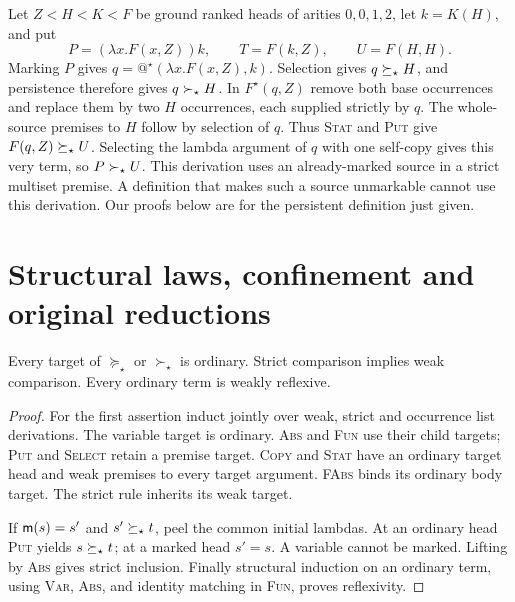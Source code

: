 \begin{remark}
Let $Z<H<K<F$ be ground ranked heads of arities $0,0,1,2$, let $k=K(H)$,
and put
\[
 P=(\lambda x.F(x,Z))k,\qquad T=F(k,Z),\qquad U=F(H,H).
\]
Marking $P$ gives $q=@^\star(\lambda x.F(x,Z),k)$. Selection gives
$q\succeq_\star H$, and persistence therefore gives $q\succ_\star H$. In
$F^\star(q,Z)$ remove both base occurrences and replace them by two
$H$ occurrences, each supplied strictly by $q$. The whole-source premises
to $H$ follow by selection of $q$. Thus \textsc{Stat} and \textsc{Put}
give $F(q,Z)\succeq_\star U$. Selecting the lambda argument of $q$ with one
self-copy gives this very term, so $P\succ_\star U$.
This derivation uses an already-marked source in a strict multiset premise.
A definition that makes such a source unmarkable cannot use this derivation.
Our proofs below are for the persistent definition just given.
\end{remark}

\section{Structural laws, confinement and original reductions}
\label{sec:stability}

\begin{lemma}\label{lem:elementary}
Every target of $\succeq_\star$ or $\succ_\star$ is ordinary.
Strict comparison implies weak comparison. Every ordinary term is
weakly reflexive.
\end{lemma}
\begin{proof}
For the first assertion induct jointly over weak, strict and occurrence
list derivations. The variable target is ordinary. \textsc{Abs} and
\textsc{Fun} use their child targets; \textsc{Put} and \textsc{Select}
retain a premise target. \textsc{Copy} and \textsc{Stat} have an ordinary
target head and weak premises to every target argument. \textsc{FAbs}
binds its ordinary body target. The strict rule inherits its weak target.

If $\mathsf m(s)=s'$ and $s'\succeq_\star t$, peel the common initial lambdas.
At an ordinary head \textsc{Put} yields $s\succeq_\star t$; at a marked head
$s'=s$. A variable cannot be marked. Lifting by \textsc{Abs} gives
strict inclusion. Finally structural induction on an ordinary term,
using \textsc{Var}, \textsc{Abs}, and identity matching in \textsc{Fun},
proves reflexivity.
\end{proof}

